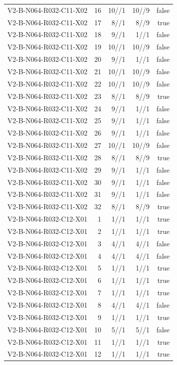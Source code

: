 {\begin{longtable}{lrrrr}
V2-B-N064-R032-C11-X02 & 16 & 10//1 & 10//9 & false \\
V2-B-N064-R032-C11-X02 & 17 & 8//1 & 8//9 & true \\
V2-B-N064-R032-C11-X02 & 18 & 9//1 & 1//1 & false \\
V2-B-N064-R032-C11-X02 & 19 & 10//1 & 10//9 & false \\
V2-B-N064-R032-C11-X02 & 20 & 9//1 & 1//1 & false \\
V2-B-N064-R032-C11-X02 & 21 & 10//1 & 10//9 & false \\
V2-B-N064-R032-C11-X02 & 22 & 10//1 & 10//9 & false \\
V2-B-N064-R032-C11-X02 & 23 & 8//1 & 8//9 & true \\
V2-B-N064-R032-C11-X02 & 24 & 9//1 & 1//1 & false \\
V2-B-N064-R032-C11-X02 & 25 & 9//1 & 1//1 & false \\
V2-B-N064-R032-C11-X02 & 26 & 9//1 & 1//1 & false \\
V2-B-N064-R032-C11-X02 & 27 & 10//1 & 10//9 & false \\
V2-B-N064-R032-C11-X02 & 28 & 8//1 & 8//9 & true \\
V2-B-N064-R032-C11-X02 & 29 & 9//1 & 1//1 & false \\
V2-B-N064-R032-C11-X02 & 30 & 9//1 & 1//1 & false \\
V2-B-N064-R032-C11-X02 & 31 & 9//1 & 1//1 & false \\
V2-B-N064-R032-C11-X02 & 32 & 8//1 & 8//9 & true \\
V2-B-N064-R032-C12-X01 & 1 & 1//1 & 1//1 & true \\
V2-B-N064-R032-C12-X01 & 2 & 1//1 & 1//1 & true \\
V2-B-N064-R032-C12-X01 & 3 & 4//1 & 4//1 & false \\
V2-B-N064-R032-C12-X01 & 4 & 4//1 & 4//1 & false \\
V2-B-N064-R032-C12-X01 & 5 & 1//1 & 1//1 & true \\
V2-B-N064-R032-C12-X01 & 6 & 1//1 & 1//1 & true \\
V2-B-N064-R032-C12-X01 & 7 & 1//1 & 1//1 & true \\
V2-B-N064-R032-C12-X01 & 8 & 4//1 & 4//1 & false \\
V2-B-N064-R032-C12-X01 & 9 & 1//1 & 1//1 & true \\
V2-B-N064-R032-C12-X01 & 10 & 5//1 & 5//1 & false \\
V2-B-N064-R032-C12-X01 & 11 & 1//1 & 1//1 & true \\
V2-B-N064-R032-C12-X01 & 12 & 1//1 & 1//1 & true \\

\end{longtable}}

